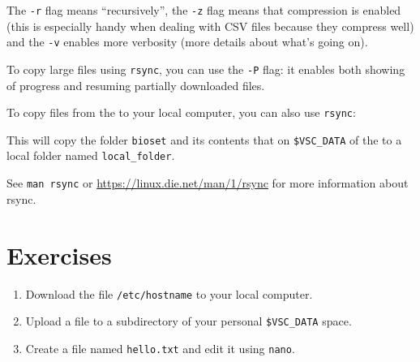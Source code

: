 The \lstinline|-r| flag means ``recursively'', the \lstinline|-z| flag means that compression
is enabled (this is especially handy when dealing with CSV files because they compress well) and the \lstinline|-v|
enables more verbosity (more details about what's going on).

To copy large files using \lstinline|rsync|, you can use the \lstinline|-P| flag: it enables
both showing of progress and resuming partially downloaded files.

To copy files from the \hpc to your local computer, you can also use \lstinline|rsync|:

\begin{prompt}
\end{prompt}

This will copy the folder \lstinline|bioset| and its contents that on \lstinline|$VSC_DATA| of
the \hpc to a local folder named \lstinline|local_folder|.

See \lstinline|man rsync| or \url{https://linux.die.net/man/1/rsync} for more information about rsync.

\section{Exercises}

\begin{enumerate}
    \item Download the file \lstinline|/etc/hostname| to your local computer.
    \item Upload a file to a subdirectory of your personal \lstinline|$VSC_DATA| space.
    \item Create a file named \lstinline|hello.txt| and edit it using \lstinline|nano|.
\end{enumerate}

